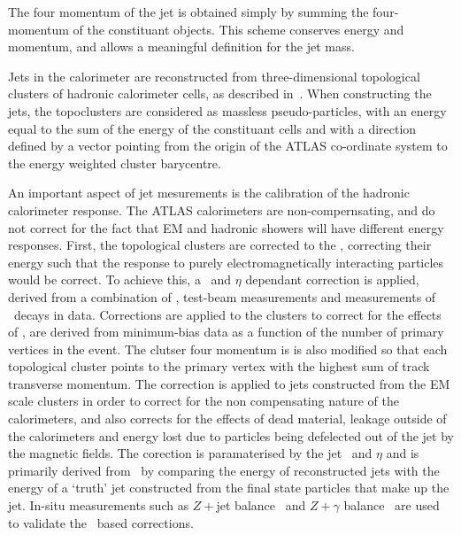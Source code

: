 The four momentum of the jet is obtained simply by summing the four-momentum of
the constituant objects. This scheme conserves energy and momentum, and allows a
meaningful definition for the jet mass.

Jets in the calorimeter are reconstructed from three-dimensional topological clusters of hadronic
calorimeter cells, as described in~. When constructing the jets, the
topoclusters are considered as massless pseudo-particles, with an energy equal
to the sum of the energy of the constituant cells and with a direction defined
by a vector pointing from the origin of the ATLAS co-ordinate system to the energy weighted cluster barycentre.

An important aspect of jet mesurements is the calibration of the hadronic
calorimeter response. The ATLAS calorimeters are non-compernsating, and do not
correct for the fact that EM and hadronic showers will have different energy
responses. First, the topological clusters are corrected to the , correcting their energy such that the response to purely electromagnetically interacting particles
would be correct. To achieve this, a \pt\ and $\eta$ dependant correction is
applied, derived from a combination of \mcsim, test-beam measurements and
measurements of \Zee\ decays in data. Corrections are applied to the
clusters to correct for the effects of \pu, are derived from minimum-bias
data as a function of the number of primary vertices in the event. 
The clutser four momentum is is also modified so that each
topological cluster points to the primary vertex with the highest sum of track
transverse momentum. The  correction is
applied to jets constructed from the EM scale clusters in order to correct for the non compensating nature of the calorimeters, and also
corrects for the effects of dead material, leakage outside of the
calorimeters and energy lost due to particles being defelected out of the jet by
the magnetic fields. The corection is paramaterised by
the jet \pt\ and $\eta$ and is primarily derived from \mcsim\ by comparing the
energy of reconstructed jets with the energy of a `truth' jet constructed from
the final state particles that make up the jet. In-situ measurements such as
$Z\plus$jet balance~\cite{ATLAS-CONF-2012-053} and $Z \plus \gamma$ balance~\cite{ATLAS-CONF-2012-063} are used to validate the \mc\ based corrections.



